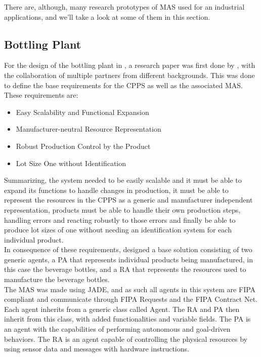 There are, although, many research prototypes of \gls{MAS} used for an industrial applications, and we'll take a look at some of them in this section.

\subsection{Bottling Plant}
\label{subsec:bottling_plant}

For the design of the bottling plant in \cite{bottling_plant_part2}, a research paper \cite{bottling_plant_part1} was first done by \citeauthor{bottling_plant_part1}, with the collaboration of multiple partners from different backgrounds. This was done to define the base requirements for the \gls{CPPS} as well as the associated \gls{MAS}. These requirements are:

\begin{itemize}
	\item Easy Scalability and Functional Expansion
	\item Manufacturer-neutral Resource Representation
	\item Robust Production Control by the Product
	\item Lot Size One without Identification
\end{itemize}

Summarizing, the system needed to be easily scalable and it must be able to expand its functions to handle changes in production, it must be able to represent the resources in the \gls{CPPS} as a generic and manufacturer independent representation, products must be able to handle their own production steps, handling errors and reacting robustly to those errors and finally be able to produce lot sizes of one without needing an identification system for each individual product.\\

In consequence of these requirements, \citeauthor{bottling_plant_part1} designed a base solution consisting of two generic agents, a \gls{PA} that represents individual products being manufactured, in this case the beverage bottles, and a \gls{RA} that represents the resources used to manufacture the beverage bottles.\\

The \gls{MAS} was made using JADE, and as such all agents in this system are \gls{FIPA} compliant and communicate through \gls{FIPA} Requests and the \gls{FIPA} Contract Net.\\

Each agent inherits from a generic class called Agent. The \gls{RA} and \gls{PA} then inherit from this class, with added functionalities and variable fields. The \gls{PA} is an agent with the capabilities of performing autonomous and goal-driven behaviors. The \gls{RA} is an agent capable of controlling the physical resources by using sensor data and messages with hardware instructions.\\

